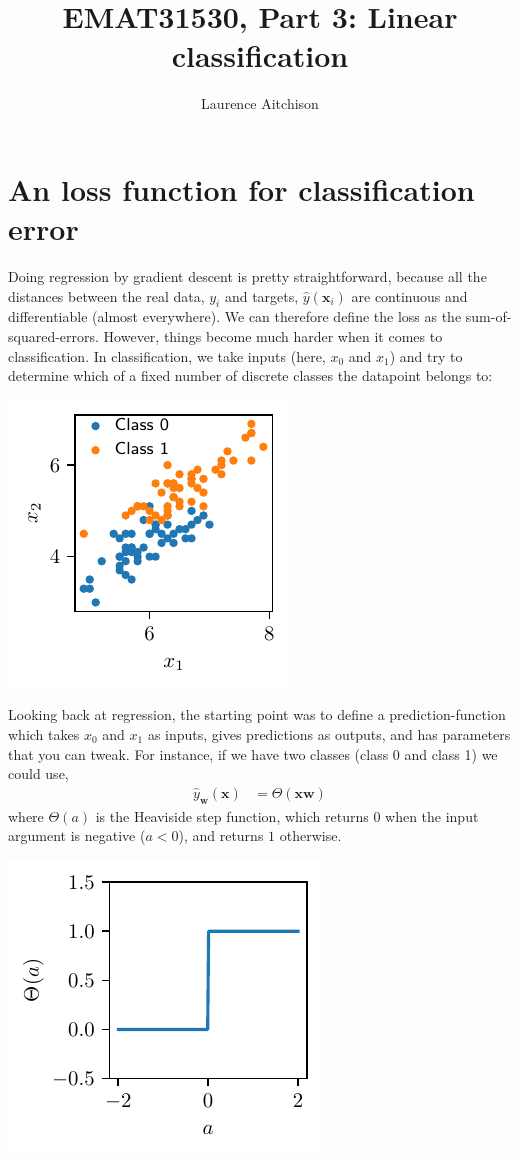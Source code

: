 \documentclass{article}
\title{EMAT31530, Part 3: Linear classification}
\author{Laurence Aitchison}
\date{}
\newcommand{\yh}{\hat{y}}
\newcommand{\x}{\mathbf{x}}
\newcommand{\w}{\mathbf{w}}
\begin{document}
\maketitle

\section{An loss function for classification error}

Doing regression by gradient descent is pretty straightforward, because all the distances between the real data, $y_i$ and targets, $\yh(\x_i)$ are continuous and differentiable (almost everywhere).
We can therefore define the loss as the sum-of-squared-errors.
However, things become much harder when it comes to classification.
In classification, we take inputs (here, $x_0$ and $x_1$) and try to determine which of a fixed number of discrete classes the datapoint belongs to:
\begin{center}
  \includegraphics{clust_example.pdf}
\end{center}
Looking back at regression, the starting point was to define a prediction-function which takes $x_0$ and $x_1$ as inputs, gives predictions as outputs, and has parameters that you can tweak.
For instance, if we have two classes (class 0 and class 1) we could use,
\begin{align}
  \yh_\w(\x) &= \Theta(\x \w)
\end{align}
where $\Theta(a)$ is the Heaviside step function, which returns $0$ when the input argument is negative ($a <0$), and returns $1$ otherwise.
\begin{center}
  \includegraphics{heaviside.pdf}
\end{center}
\end{document}
